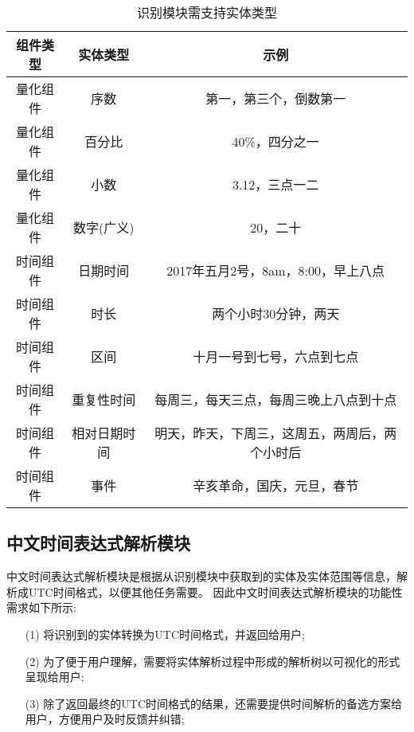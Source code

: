 \begin{table}[h]
    \centering
    \caption{识别模块需支持实体类型}
    \begin{tabular}{*{3}{c}}
        \toprule
        组件类型 & 实体类型     & 示例                                                 \\
        \midrule
        量化组件 & 序数         & 第一，第三个，倒数第一                               \\
        量化组件 & 百分比       & 40\%，四分之一                                       \\
        量化组件 & 小数         & 3.12，三点一二                                       \\
        量化组件 & 数字(广义)   & 20，二十                                             \\
        时间组件 & 日期时间     & 2017年五月2号，8am，8:00，早上八点                   \\
        时间组件 & 时长         & 两个小时30分钟，两天                                 \\
        时间组件 & 区间         & 十月一号到七号，六点到七点                           \\
        时间组件 & 重复性时间   & 每周三，每天三点，每周三晚上八点到十点               \\
        时间组件 & 相对日期时间 & 明天，昨天，下周三，这周五，两周后，两个小时后 \\
        时间组件 & 事件         & 辛亥革命，国庆，元旦，春节                           \\
        \bottomrule
    \end{tabular}
    \label{tab:support_ne}
\end{table}

\subsection{中文时间表达式解析模块}

中文时间表达式解析模块是根据从识别模块中获取到的实体及实体范围等信息，解析成UTC时间格式，以便其他任务需要。
因此中文时间表达式解析模块的功能性需求如下所示:
\begin{enumerate}
    \item[(1)] 将识别到的实体转换为UTC时间格式，并返回给用户;
    \item[(2)] 为了便于用户理解，需要将实体解析过程中形成的解析树以可视化的形式呈现给用户;
    \item[(3)] 除了返回最终的UTC时间格式的结果，还需要提供时间解析的备选方案给用户，方便用户及时反馈并纠错;
\end{enumerate}

